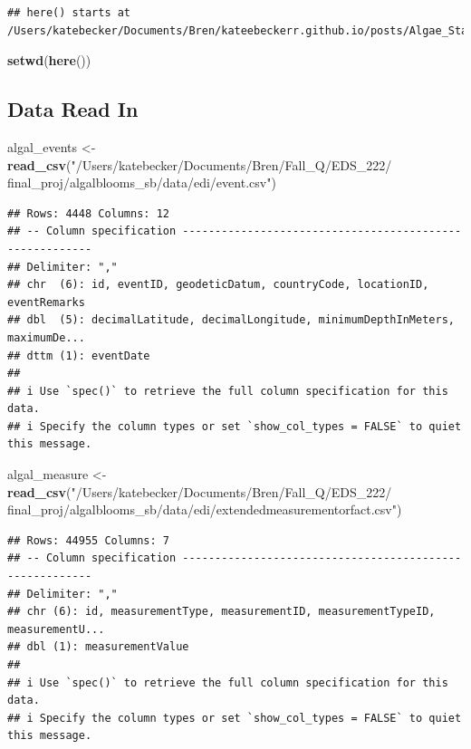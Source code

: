 \documentclass[
]{article}
\newenvironment{Shaded}{\begin{snugshade}}{\end{snugshade}}
\newcommand{\FunctionTok}[1]{\textcolor[rgb]{0.13,0.29,0.53}{\textbf{#1}}}
\newcommand{\NormalTok}[1]{#1}
\newcommand{\OtherTok}[1]{\textcolor[rgb]{0.56,0.35,0.01}{#1}}
\newcommand{\StringTok}[1]{\textcolor[rgb]{0.31,0.60,0.02}{#1}}
\begin{document}
\begin{verbatim}
## here() starts at /Users/katebecker/Documents/Bren/kateebeckerr.github.io/posts/Algae_Stats
\end{verbatim}

\begin{Shaded}
\begin{Highlighting}[]
\FunctionTok{setwd}\NormalTok{(}\FunctionTok{here}\NormalTok{())}
\end{Highlighting}
\end{Shaded}

\hypertarget{data-read-in}{%
\subsection{Data Read In}\label{data-read-in}}

\begin{Shaded}
\begin{Highlighting}[]
\NormalTok{algal\_events }\OtherTok{\textless{}{-}} \FunctionTok{read\_csv}\NormalTok{(}\StringTok{"/Users/katebecker/Documents/Bren/Fall\_Q/EDS\_222/ final\_proj/algalblooms\_sb/data/edi/event.csv"}\NormalTok{)}
\end{Highlighting}
\end{Shaded}

\begin{verbatim}
## Rows: 4448 Columns: 12
## -- Column specification --------------------------------------------------------
## Delimiter: ","
## chr  (6): id, eventID, geodeticDatum, countryCode, locationID, eventRemarks
## dbl  (5): decimalLatitude, decimalLongitude, minimumDepthInMeters, maximumDe...
## dttm (1): eventDate
## 
## i Use `spec()` to retrieve the full column specification for this data.
## i Specify the column types or set `show_col_types = FALSE` to quiet this message.
\end{verbatim}

\begin{Shaded}
\begin{Highlighting}[]
\NormalTok{algal\_measure }\OtherTok{\textless{}{-}} \FunctionTok{read\_csv}\NormalTok{(}\StringTok{"/Users/katebecker/Documents/Bren/Fall\_Q/EDS\_222/ final\_proj/algalblooms\_sb/data/edi/extendedmeasurementorfact.csv"}\NormalTok{)}
\end{Highlighting}
\end{Shaded}

\begin{verbatim}
## Rows: 44955 Columns: 7
## -- Column specification --------------------------------------------------------
## Delimiter: ","
## chr (6): id, measurementType, measurementID, measurementTypeID, measurementU...
## dbl (1): measurementValue
## 
## i Use `spec()` to retrieve the full column specification for this data.
## i Specify the column types or set `show_col_types = FALSE` to quiet this message.
\end{verbatim}
\end{document}
